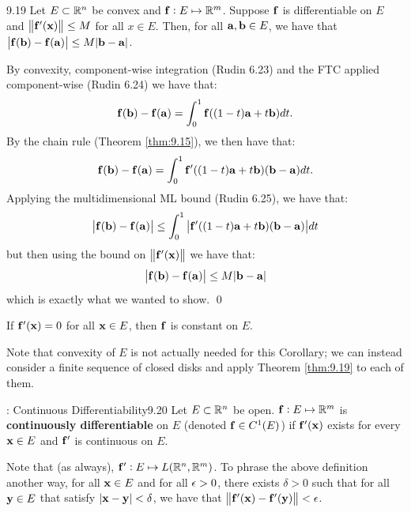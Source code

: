 \setcounter{rudin}{18}
\begin{theorem}{}{9.19}
    Let $E \subset \mathbb{R}^n$ be convex and $\mathbf{f}: E \mapsto \mathbb{R}^m$. Suppose $\mathbf{f}$ is differentiable on $E$ and $\norm{\mathbf{f}'(\mathbf{x})} \leq M$ for all $x \in E$. Then, for all $\mathbf{a}, \mathbf{b} \in E$, we have that $\abs{\mathbf{f}(\mathbf{b}) - \mathbf{f}(\mathbf{a})} \leq M\abs{\mathbf{b} - \mathbf{a}}$.
\end{theorem}
\begin{nproof}
    By convexity, component-wise integration (Rudin 6.23) and the FTC applied component-wise (Rudin 6.24) we have that:
    \begin{align*}
        \mathbf{f}(\mathbf{b}) - \mathbf{f}(\mathbf{a}) = \int_0^1\mathbf{f}((1 - t)\mathbf{a} + t\mathbf{b})dt.
    \end{align*}
    By the chain rule (Theorem \ref{thm:9.15}), we then have that:
    \begin{align*}
        \mathbf{f}(\mathbf{b}) - \mathbf{f}(\mathbf{a}) = \int_0^1\mathbf{f}'((1-t)\mathbf{a} + t\mathbf{b})(\mathbf{b} - \mathbf{a})dt.
    \end{align*}
    Applying the multidimensional ML bound (Rudin 6.25), we have that:
    \begin{align*}
        \abs{\mathbf{f}(\mathbf{b}) - \mathbf{f}(\mathbf{a})} \leq \int_0^1\abs{\mathbf{f}'((1-t)\mathbf{a} + t\mathbf{b})(\mathbf{b} - \mathbf{a})}dt
    \end{align*}
    but then using the bound on $\norm{\mathbf{f}'(\mathbf{x})}$ we have that:
    \begin{align*}
        \abs{\mathbf{f}(\mathbf{b}) - \mathbf{f}(\mathbf{a})} \leq M\abs{\mathbf{b} - \mathbf{a}}
    \end{align*}
    which is exactly what we wanted to show. \qed
\end{nproof}

\begin{ncorollary}{}{}
    If $\mathbf{f}'(\mathbf{x}) = 0$ for all $\mathbf{x} \in E$, then $\mathbf{f}$ is constant on $E$. 
\end{ncorollary}
\noindent Note that convexity of $E$ is not actually needed for this Corollary; we can instead consider a finite sequence of closed disks and apply Theorem \ref{thm:9.19} to each of them.

\begin{definition}{: Continuous Differentiability}{9.20}
    Let $E \subset \mathbb{R}^n$ be open. $\mathbf{f}: E \mapsto \mathbb{R}^m$ is \textbf{continuously differentiable} on $E$ (denoted $\mathbf{f} \in C^1(E)$) if $\mathbf{f}'(\mathbf{x})$ exists for every $\mathbf{x} \in E$ and $\mathbf{f}'$ is continuous on $E$.
\end{definition}
\noindent Note that (as always), $\mathbf{f}': E \mapsto L(\mathbb{R}^n, \mathbb{R}^m)$. To phrase the above definition another way, for all $\mathbf{x} \in E$ and for all $\epsilon > 0$, there exists $\delta > 0$ such that for all $\mathbf{y} \in E$ that satisfy $\abs{\mathbf{x} - \mathbf{y}} < \delta$, we have that $\norm{\mathbf{f}'(\mathbf{x}) - \mathbf{f}'(\mathbf{y})} < \epsilon$. 

